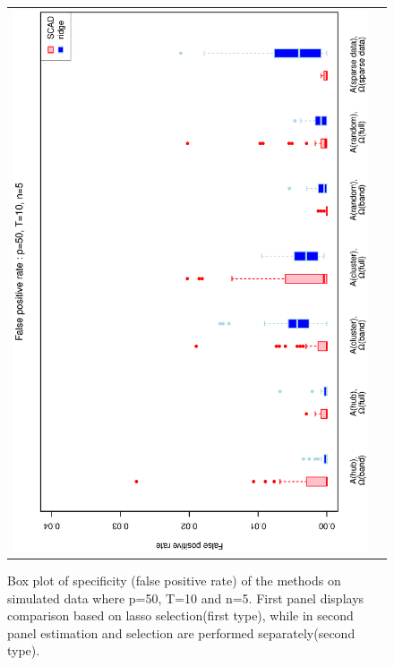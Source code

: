 \documentclass[a4paper]{article}
\begin{document}
\begin{figure}[h!]
\begin{tabular}{cc}
\includegraphics[scale=0.5,angle=270]{ROCfpr50T10N5b.eps}\\
\end{tabular}
\caption{Box plot of specificity (false positive rate) of the methods on simulated data where p=50, T=10 and n=5.  First panel displays comparison based on lasso selection(first type), while in second panel estimation and selection are performed separately(second type).}
\label{fig:fpr50T10N5}
\end{figure}
\end{document}
